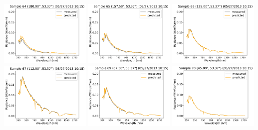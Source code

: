 \begin{center}
\includegraphics[width=0.325\textwidth]{img/05271015_s64.pdf}
\includegraphics[width=0.325\textwidth]{img/05271015_s65.pdf}
\includegraphics[width=0.325\textwidth]{img/05271015_s66.pdf}\\
\includegraphics[width=0.325\textwidth]{img/05271015_s67.pdf}
\includegraphics[width=0.325\textwidth]{img/05271015_s69.pdf}
\includegraphics[width=0.325\textwidth]{img/05271015_s70.pdf}\\

\end{center}
